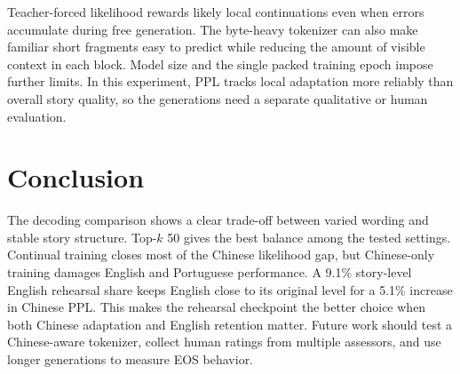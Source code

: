 \documentclass[11pt]{article}
\begin{document}
Teacher-forced likelihood rewards likely local continuations even when errors accumulate
during free generation. The byte-heavy tokenizer can also make familiar short fragments easy
to predict while reducing the amount of visible context in each block. Model size and the
single packed training epoch impose further limits. In this experiment, PPL tracks local
adaptation more reliably than overall story quality, so the generations need a separate
qualitative or human evaluation.

\section{Conclusion}

The decoding comparison shows a clear trade-off between varied wording and stable story
structure. Top-$k$ 50 gives the best balance among the tested settings. Continual training
closes most of the Chinese likelihood gap, but Chinese-only training damages English and
Portuguese performance. A 9.1\% story-level English rehearsal share keeps English close to
its original level for a 5.1\% increase in Chinese PPL. This makes the rehearsal checkpoint
the better choice when both Chinese adaptation and English retention matter. Future work
should test a Chinese-aware tokenizer, collect human ratings from multiple assessors, and
use longer generations to measure EOS behavior.

{\small
\setlength{\bibsep}{0pt plus 0.3ex}
\clearpage


}
\end{document}
